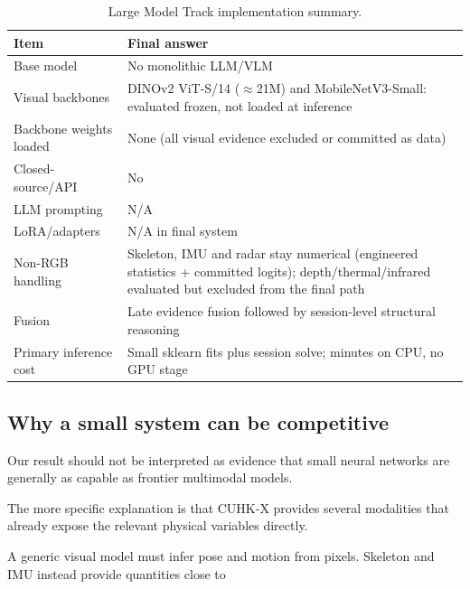 \documentclass[12pt,a4paper]{article}
\begin{document}
\begin{table}[ht]
\centering
\small
\begin{tabularx}{\textwidth}{p{5.0cm}X}
\toprule
\textbf{Item} & \textbf{Final answer} \\
\midrule

Base model &
No monolithic LLM/VLM \\

Visual backbones &
DINOv2 ViT-S/14 ($\approx$21M) and MobileNetV3-Small: evaluated frozen,
not loaded at inference \\

Backbone weights loaded &
None (all visual evidence excluded or committed as data) \\

Closed-source/API &
No \\

LLM prompting &
N/A \\

LoRA/adapters &
N/A in final system \\

Non-RGB handling &
Skeleton, IMU and radar stay numerical (engineered statistics + committed
logits); depth/thermal/infrared evaluated but excluded from the final path \\

Fusion &
Late evidence fusion followed by session-level structural reasoning \\

Primary inference cost &
Small sklearn fits plus session solve; minutes on CPU, no GPU stage \\

\bottomrule
\end{tabularx}
\caption{Large Model Track implementation summary.}
\end{table}

\subsection{Why a small system can be competitive}

Our result should not be interpreted as evidence that small neural networks are
generally as capable as frontier multimodal models.

The more specific explanation is that CUHK-X provides several modalities that
already expose the relevant physical variables directly.

A generic visual model must infer pose and motion from pixels. Skeleton and IMU
instead provide quantities close to
\end{document}
